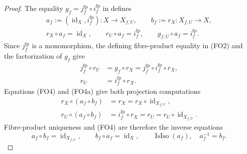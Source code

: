 \begin{proof}
  The equality
  $g_f=j_f^{\mathrm{fp}}\circ i_f^{\mathrm{fp}}$ in
   defines
  \[
  \begin{gathered}
    a_f:=(\operatorname{id}_X,i_f^{\mathrm{fp}})
      \colon X\to X_{f,U},
    \qquad
    b_f:=r_X\colon X_{f,U}\to X,\\
    r_X\circ a_f=\operatorname{id}_X,
    \qquad
    r_U\circ a_f=i_f^{\mathrm{fp}},
    \qquad
    g_{f,U}\circ a_f=i_f^{\mathrm{fp}}.
  \end{gathered}                                                    \tag{FO4}
  \]
  Since $j_f^{\mathrm{fp}}$ is a monomorphism, the defining fibre-product
  equality in (FO2) and the factorization of $g_f$ give
  \[
  \begin{aligned}
    j_f^{\mathrm{fp}}\circ r_U
      &=g_f\circ r_X
       =j_f^{\mathrm{fp}}\circ i_f^{\mathrm{fp}}\circ r_X,\\
    r_U&=i_f^{\mathrm{fp}}\circ r_X.
  \end{aligned}                                                     \tag{FO4a}
  \]
  Equations (FO4) and (FO4a) give both projection computations
  \[
  \begin{aligned}
    r_X\circ(a_f\circ b_f)
      &=r_X
       =r_X\circ\operatorname{id}_{X_{f,U}},\\
    r_U\circ(a_f\circ b_f)
      &=i_f^{\mathrm{fp}}\circ r_X
       =r_U
       =r_U\circ\operatorname{id}_{X_{f,U}}.
  \end{aligned}
  \]
  Fibre-product uniqueness and (FO4) are therefore the inverse equations
  \[
    a_f\circ b_f=\operatorname{id}_{X_{f,U}},
    \qquad
    b_f\circ a_f=\operatorname{id}_X,
    \qquad
    \operatorname{IsIso}(a_f),\quad a_f^{-1}=b_f.                 \tag{FO4b}
  \]


\end{proof}
